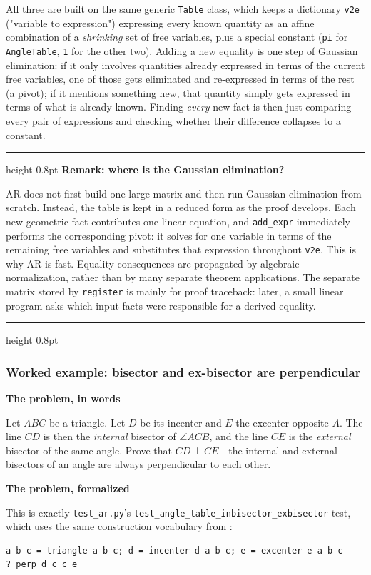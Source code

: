 \documentclass[reqno]{amsart}
\newenvironment{lecturebox}[1]{%
    \par\medskip
    \noindent\begingroup
    \setlength{\parindent}{0pt}
    \color{agblue}\hrule height 0.8pt\color{black}
    \smallskip
    \textbf{\color{agblue}#1}\par\smallskip
}{%
    \smallskip
    \color{agblue}\hrule height 0.8pt\color{black}
    \endgroup
    \medskip
}
\newcommand{\examplepart}[1]{%
    \par\medskip
    \noindent\textbf{\color{agblue}#1}\par\smallskip\noindent
}
\DeclareMathOperator{\1}{\textbf{1}}
\begin{document}
All three are built on the same generic \verb|Table| class, which keeps a
dictionary \verb|v2e| ("variable to expression") expressing every known
quantity as an affine combination of a \emph{shrinking} set of free
variables, plus a special constant (\verb|pi| for \verb|AngleTable|, \verb|1|
for the other two). Adding a new equality is one step of Gaussian
elimination: if it only involves quantities already expressed in terms of
the current free variables, one of those gets eliminated and re-expressed in
terms of the rest (a pivot); if it mentions something new, that quantity
simply gets expressed in terms of what is already known. Finding
\emph{every} new fact is then just comparing every pair of expressions and
checking whether their difference collapses to a constant.

\begin{lecturebox}{Remark: where is the Gaussian elimination?}
AR does not first build one large matrix and then run Gaussian elimination
from scratch. Instead, the table is kept in a reduced form as the proof
develops. Each new geometric fact contributes one linear equation, and
\verb|add_expr| immediately performs the corresponding pivot: it solves for
one variable in terms of the remaining free variables and substitutes that
expression throughout \verb|v2e|. This is why AR is fast. Equality
consequences are propagated by algebraic normalization, rather than by many
separate theorem applications. The separate matrix stored by \verb|register|
is mainly for proof traceback: later, a small linear program asks which input
facts were responsible for a derived equality.
\end{lecturebox}

\subsubsection{Worked example: bisector and ex-bisector are perpendicular}
\leavevmode\par\nobreak\smallskip
\examplepart{The problem, in words}
Let $ABC$ be a triangle. Let $D$ be its
incenter and $E$ the excenter opposite $A$. The line $CD$ is then the
\emph{internal} bisector of $\angle ACB$, and the line $CE$ is the
\emph{external} bisector of the same angle. Prove that $CD \perp CE$ - the
internal and external bisectors of an angle are always perpendicular to each
other.

\examplepart{The problem, formalized}
This is exactly \verb|test_ar.py|'s
\verb|test_angle_table_inbisector_exbisector| test,
which uses the same construction vocabulary from :
\begin{lstlisting}
a b c = triangle a b c; d = incenter d a b c; e = excenter e a b c
? perp d c c e
\end{lstlisting}
\end{document}
